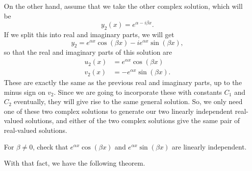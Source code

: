 \documentclass{ximera}
\begin{document}
On the other hand, assume that we take the other complex solution, which will be  
\begin{equation*}
    y_2(x) = e^{\alpha - i\beta x}.
\end{equation*}
If we split this into real and imaginary parts, we will get 
\begin{equation*}
    y_2  = e^{\alpha x} \cos (\beta x) - i e^{\alpha x} \sin (\beta x),
\end{equation*}
so that the real and imaginary parts of this solution are
\begin{equation*}
    \begin{split}
        u_2(x) &= e^{\alpha x} \cos (\beta x) \\
        v_2(x) &= -e^{\alpha x} \sin (\beta x).
    \end{split}
\end{equation*}
These are exactly the same as the previous real and imaginary parts, up to the minus sign on $v_2$. Since we are going to incorporate these with constants $C_1$ and $C_2$ eventually, they will give rise to the same general solution. So, we only need one of these two complex solutions to generate our two linearly independent real-valued solutions, and either of the two complex solutions give the same pair of real-valued solutions.

\begin{exercise}
    For $\beta \neq 0$, check that $e^{\alpha x} \cos (\beta x)$ and $e^{\alpha x} \sin (\beta x)$ are linearly independent.
\end{exercise}

With that fact, we have the following theorem. 

%
%
\end{document}
